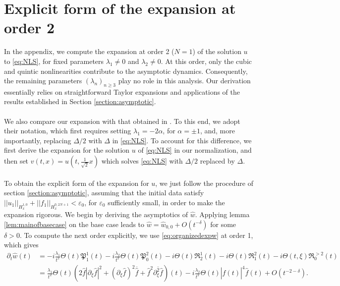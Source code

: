 \documentclass[a4paper, 15pt]{article}
\numberwithin{equation}{section}
\begin{document}
\section{Explicit form of the expansion at order 2}
\label{section:appendix}
In the appendix, we compute the expansion at order 2 ($N=1$) of the solution $u$ to \eqref{eq:NLS}, for fixed parameters $\lambda_1\neq0$ and $\lambda_2\neq0$. At this order, only the cubic and quintic nonlinearities contribute to the asymptotic dynamics. Consequently, the remaining parameters $(\lambda_n)_{n\geq3}$ play no role in this analysis. Our derivation essentially relies on straightforward Taylor expansions and applications of the results established in Section \ref{section:asymptotic}. \\\\
We also compare our expansion with that obtained in \cite{10.1063/1.522967}. To this end, we adopt their notation, which first requires setting  $\lambda_1=-2\alpha$, for $\alpha=\pm1$, and, more importantly, replacing $\Delta/2$ with $\Delta$ in \eqref{eq:NLS}. To account for this difference, we first derive the expansion for the solution $u$ of \eqref{eq:NLS} in our normalization, and then set $v(t,x)=u\left(t,\frac{1}{\sqrt{2}}x\right)$ which solves \eqref{eq:NLS} with $\Delta/2$ replaced by $\Delta$. \\\\
To obtain the explicit form of the expansion for $u$, we just follow the procedure of section \ref{section:asymptotic}, assuming that the initial data satisfy $||u_1||_{H^{1,0}_x}+||f_1||_{H^{0,2N+1}_x}<\varepsilon_0$, for $\varepsilon_0$ sufficiently small, in order to make the expansion rigorous. We begin by deriving the asymptotics of $\hat{w}$. Applying lemma \ref{lem:mainofbasecase} on the base case leads to $\hat{w}=\hat{w}_{0,0}+O(t^{-\delta})$ for some $\delta>0$. To compute the next order explicitly, we use \eqref{eq:organizedexpw} at order 1, which gives
\begin{align*}
 \partial_t\hat{w}(t)&=-i\frac{\lambda_1}{t^2}\Theta(t)\mathfrak{P}^1_1(t)-i\frac{\lambda_2}{t^2}\Theta(t)\mathfrak{P}^2_0(t)-i\Theta(t)\mathfrak{R}^1_2(t)-i\Theta(t)\mathfrak{R}^2_1(t)-i\Theta(t,\xi)\mathfrak{R}^{>2}_0(t)\\
 &=\frac{\lambda_1}{t^2}\Theta(t)\left(2\hat{f}|\partial_\xi\hat{f}|^2+(\partial_\xi\hat{f})^2\overline{\hat{f}}+\hat{f}^2\overline{\partial_\xi^2\hat{f}}\right)(t)-i\frac{\lambda_2}{t^2}\Theta(t)|\hat{f}(t)|^4\hat{f}(t)+O(t^{-2-\delta}).
\end{align*}
\end{document}
